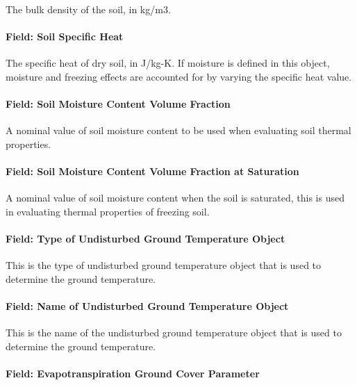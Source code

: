 The bulk density of the soil, in kg/m3.

\paragraph{Field: Soil Specific Heat}\label{field-soil-specific-heat-3}

The specific heat of dry soil, in J/kg-K. If moisture is defined in this object, moisture and freezing effects are accounted for by varying the specific heat value.

\paragraph{Field: Soil Moisture Content Volume Fraction}\label{field-soil-moisture-content-volume-fraction-1}

A nominal value of soil moisture content to be used when evaluating soil thermal properties.

\paragraph{Field: Soil Moisture Content Volume Fraction at Saturation}\label{field-soil-moisture-content-volume-fraction-at-saturation-1}

A nominal value of soil moisture content when the soil is saturated, this is used in evaluating thermal properties of freezing soil.

\paragraph{Field: Type of Undisturbed Ground Temperature Object}\label{field-type-of-undisturbed-ground-temperature-object-000}

This is the type of undisturbed ground temperature object that is used to determine the ground temperature.

\paragraph{Field: Name of Undisturbed Ground Temperature Object}\label{field-name-of-undisturbed-ground-temperature-object-000}

This is the name of the undisturbed ground temperature object that is used to determine the ground temperature.

\paragraph{Field: Evapotranspiration Ground Cover Parameter}\label{field-evapotranspiration-ground-cover-parameter-1}


